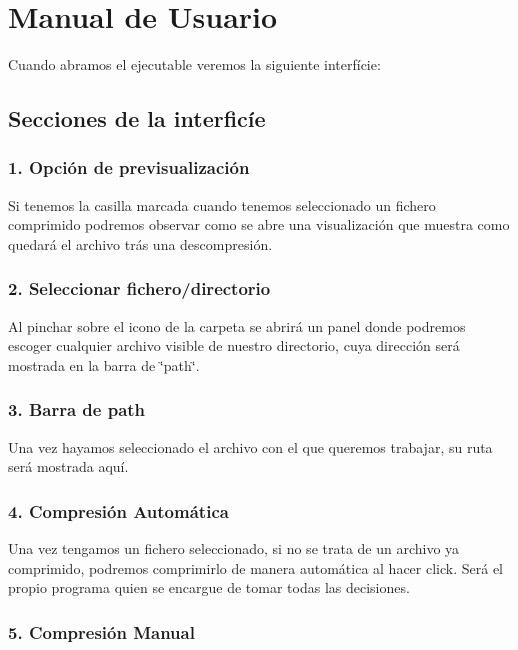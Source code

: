 \section*{Manual de Usuario}

Cuando abramos el ejecutable veremos la siguiente interfície\+:



\subsection*{Secciones de la interficíe}

\subsubsection*{1. Opción de previsualización}

Si tenemos la casilla marcada cuando tenemos seleccionado un fichero comprimido podremos observar como se abre una visualización que muestra como quedará el archivo trás una descompresión.

\subsubsection*{2. Seleccionar fichero/directorio}

Al pinchar sobre el icono de la carpeta se abrirá un panel donde podremos escoger cualquier archivo visible de nuestro directorio, cuya dirección será mostrada en la barra de \char`\"{}path\char`\"{}.



\subsubsection*{3. Barra de path}

Una vez hayamos seleccionado el archivo con el que queremos trabajar, su ruta será mostrada aquí.

\subsubsection*{4. Compresión Automática}

Una vez tengamos un fichero seleccionado, si no se trata de un archivo ya comprimido, podremos comprimirlo de manera automática al hacer click. Será el propio programa quien se encargue de tomar todas las decisiones.

\subsubsection*{5. Compresión Manual}


